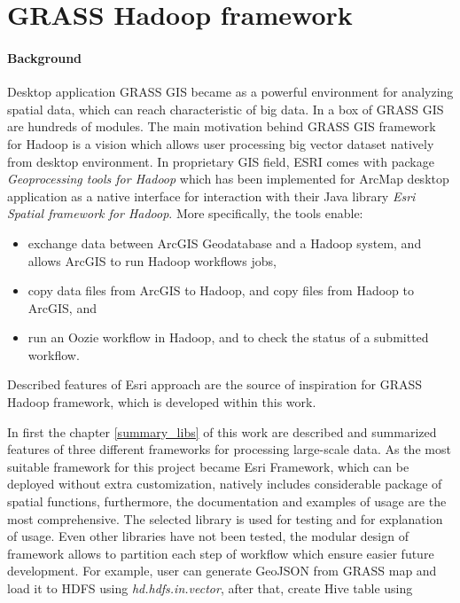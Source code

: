 \documentclass[a4paper,12pt,oneside]{report}
\begin{document}
    \section{GRASS Hadoop framework}
    \paragraph{Background}
    Desktop application GRASS GIS became as a powerful environment for analyzing
    spatial data, which can  reach characteristic of big data. In a box of GRASS GIS are 
    hundreds of modules. The main motivation behind GRASS GIS framework for Hadoop is 
    a vision which allows user
    processing big vector dataset natively from desktop environment. In proprietary GIS field,
    ESRI comes with package \textit{Geoprocessing tools for Hadoop}\cite{esri_gtfp} 
    which has been implemented for ArcMap desktop application  as a native interface
    for interaction with  their Java library \textit{Esri Spatial framework for Hadoop}. More
    specifically, the tools enable:
	
	\begin{itemize}
		\item exchange data between ArcGIS Geodatabase and a Hadoop system, and allows
		ArcGIS to run Hadoop workflows jobs,
		\item copy data files from ArcGIS to Hadoop, and copy files from Hadoop to
		ArcGIS, and 
		\item run an Oozie workflow in Hadoop, and to check the status of a submitted
		workflow.
	\end{itemize}
	
    Described features of Esri approach are the source of inspiration for GRASS Hadoop framework, 
    which is developed within this work.
    
    In first the chapter \ref{summary_libs} of this work are described and
    summarized features of three different frameworks for processing large-scale
    data.     As the most suitable framework for this project became Esri Framework, which
    can be deployed without extra customization, natively includes considerable
    package of spatial functions, furthermore, the documentation  and examples of
    usage are  the most comprehensive. The selected library is used for testing
    and for explanation of usage. Even other libraries have
    not been tested, the modular design of framework allows to partition each step
    of workflow which ensure easier future development. For example,
    user can generate GeoJSON from GRASS map and load it to HDFS using
    \textit{hd.hdfs.in.vector}, after that, create Hive table using
\end{document}
